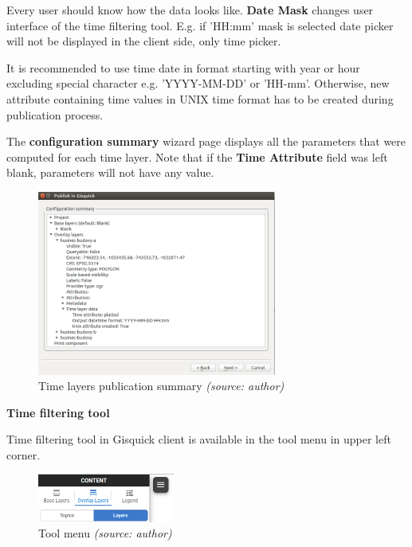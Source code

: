 Every user should know how the data looks like. 
\textbf{Date Mask} changes user interface of the time filtering tool. 
E.g. if 'HH:mm' mask is selected date picker will not be 
displayed in the client side, only time picker. 

It is recommended to use time date in format starting with 
year or hour excluding special character e.g. 'YYYY-MM-DD' or 'HH-mm'. 
Otherwise, new attribute containing time values in UNIX time format 
has to be created during publication process.

The \textbf{configuration summary} wizard page displays all the parameters 
that were computed for each time layer. Note that if the 
\textbf{Time Attribute} field was left blank, parameters will not have any 
value.

\begin{figure}[h!]
	\centering
	\includegraphics[width=0.7\textwidth]{./img/project-publishing-time-summary.png}
	\caption{Time layers publication summary \textit{(source: author)}}
	\label{fig:publication-wizard-summary}
\end{figure}

\bigskip
\noindent \textbf{Time filtering tool}

Time filtering tool in Gisquick client is available in the tool menu 
in upper left corner. 

\begin{figure}[h!]
	\centering
	\includegraphics[width=0.4\textwidth]{./img/burger-menu.png}
	\caption{Tool menu \textit{(source: author)}}
	\label{fig:burger-menu}
\end{figure}


